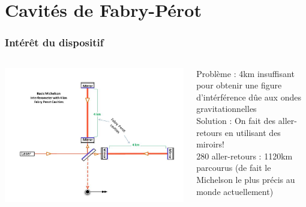 \documentclass{beamer}
\begin{document}
\section{Cavités de Fabry-Pérot}
\begin{frame}
	\frametitle{Intérêt du dispositif}
	\begin{columns}
		\begin{column}{0.5\textwidth}
		\includegraphics[width=\textwidth]{Docs/fabry_perot.jpg}
		\end{column}
		\begin{column}{0.5\textwidth}
		Problème : 4km insuffisant pour obtenir une figure d'intérférence dûe aux ondes gravitationnelles\\
		Solution : On fait des aller-retours en utilisant des miroirs!
		\bigskip\\
		280 aller-retours : 1120km parcourus (de fait le Michelson le plus précis au monde actuellement)
		\end{column}
	\end{columns}
\end{frame}
\end{document}
